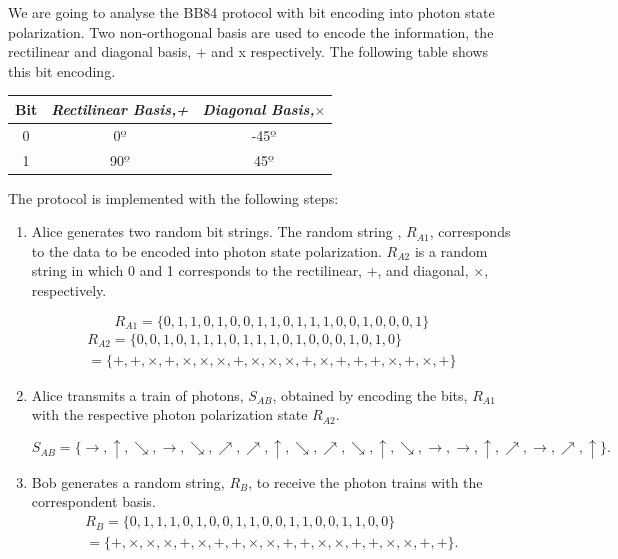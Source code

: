 We are going to analyse the BB84 protocol with bit encoding into photon state polarization. Two non-orthogonal basis are used to encode the information, the rectilinear and diagonal basis, + and x respectively. The following table shows this bit encoding.
\begin{table}[H]
	\centering
	\begin{tabular}{c|c|c}
		 Bit &  \textbf{\textit{Rectilinear Basis,+}} & \textbf{\textit{Diagonal Basis,$\times$}}\\ \hline
		0 &  0$º$ & -45$º$ \\
		1 & 90$º$ & 45$º$\\
	\end{tabular}
\end{table}

The protocol is implemented with the following steps:
\begin{enumerate}
	\item Alice generates two random bit strings. The random string , $R_{A1}$, corresponds to the data to be encoded into photon state polarization. $R_{A2}$ is a random string in which 0 and 1 corresponds to the rectilinear, +, and diagonal, $\times$, respectively.
	
	$$ R_{A1} = \{0,1,1,0,1,0,0,1,1,0,1,1,1,0,0,1,0,0,0,1\}$$
	\begin{eqnarray}
		R_{A2} = \{0,0,1,0,1,1,1,0,1,1,1,0,1,0,0,0,1,0,1,0\} \\
		= \{+,+,\times,+,\times, \times, \times, +,\times, \times, \times,+,\times,+,+,+,\times,+,\times,+\}
	\end{eqnarray}
	
	\item Alice transmits a train of photons, $S_{AB}$, obtained by encoding the bits, $R_{A1}$ with the respective photon polarization state $R_{A2}$.
	
	$$S_{AB} = \{\to, \uparrow, \searrow, \to, \searrow, \nearrow, \nearrow, \uparrow, \searrow, \nearrow, \searrow, \uparrow, \searrow, \to, \to, \uparrow, \nearrow, \to, \nearrow, \uparrow\}.$$
	
	\item Bob generates a random string, $R_{B}$, to receive the photon trains with the correspondent basis.
	\begin{eqnarray}
	R_{B} = \{0,1,1,1,0,1,0,0,1,1,0,0,1,1,0,0,1,1,0,0\} \\
	=\{+,\times,\times,\times,+,\times,+,+,\times,\times,+,+,\times,\times,+,+,\times,\times,+,+\}.
	\end{eqnarray}
	

\end{enumerate}
